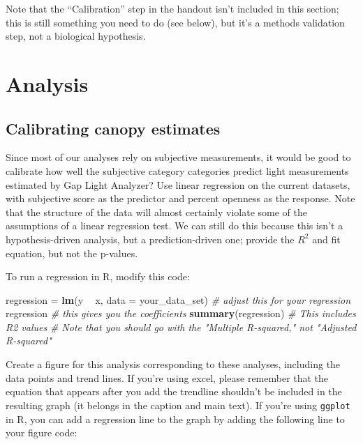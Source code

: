 \documentclass[]{book}
\newenvironment{Shaded}{\begin{snugshade}}{\end{snugshade}}
\newcommand{\KeywordTok}[1]{\textcolor[rgb]{0.13,0.29,0.53}{\textbf{#1}}}
\newcommand{\DataTypeTok}[1]{\textcolor[rgb]{0.13,0.29,0.53}{#1}}
\newcommand{\StringTok}[1]{\textcolor[rgb]{0.31,0.60,0.02}{#1}}
\newcommand{\CommentTok}[1]{\textcolor[rgb]{0.56,0.35,0.01}{\textit{#1}}}
\newcommand{\OperatorTok}[1]{\textcolor[rgb]{0.81,0.36,0.00}{\textbf{#1}}}
\newcommand{\NormalTok}[1]{#1}
\begin{document}
Note that the ``Calibration'' step in the handout isn't included in this
section; this is still something you need to do (see below), but it's a
methods validation step, not a biological hypothesis.

\section{Analysis}\label{analysis}

\subsection{Calibrating canopy
estimates}\label{calibrating-canopy-estimates}

Since most of our analyses rely on subjective measurements, it would be
good to calibrate how well the subjective category categories predict
light measurements estimated by Gap Light Analyzer? Use linear
regression on the current datasets, with subjective score as the
predictor and percent openness as the response. Note that the structure
of the data will almost certainly violate some of the assumptions of a
linear regression test. We can still do this because this isn't a
hypothesis-driven analysis, but a prediction-driven one; provide the
\(R^2\) and fit equation, but not the p-values.

To run a regression in R, modify this code:

\begin{Shaded}
\begin{Highlighting}[]
\NormalTok{regression =}\StringTok{ }\KeywordTok{lm}\NormalTok{(y }\OperatorTok{~}\StringTok{ }\NormalTok{x, }\DataTypeTok{data =}\NormalTok{ your_data_set) }\CommentTok{# adjust this for your regression}
\NormalTok{regression }\CommentTok{# this gives you the coefficients}
\KeywordTok{summary}\NormalTok{(regression) }\CommentTok{# This includes R2 values}
\CommentTok{# Note that you should go with the "Multiple R-squared," not "Adjusted R-squared"}
\end{Highlighting}
\end{Shaded}

Create a figure for this analysis corresponding to these analyses,
including the data points and trend lines. If you're using excel, please
remember that the equation that appears after you add the trendline
shouldn't be included in the resulting graph (it belongs in the caption
and main text). If you're using \texttt{ggplot} in R, you can add a
regression line to the graph by adding the following line to your figure
code:
\end{document}
